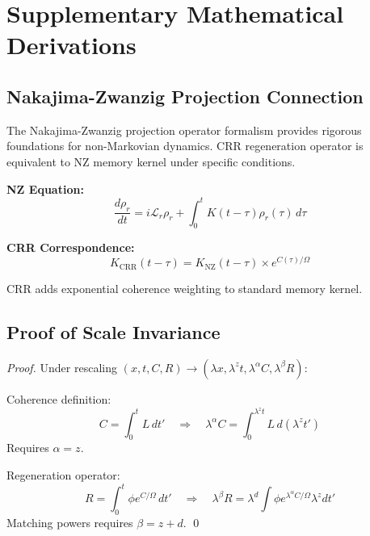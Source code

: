 \documentclass[11pt,a4paper]{article}
\theoremstyle{definition}
\theoremstyle{remark}
\begin{document}
\section{Supplementary Mathematical Derivations}

\subsection{Nakajima-Zwanzig Projection Connection}

The Nakajima-Zwanzig projection operator formalism provides rigorous foundations for non-Markovian dynamics. CRR regeneration operator is equivalent to NZ memory kernel under specific conditions.

\textbf{NZ Equation:}
\begin{equation}
\frac{d\rho_r}{dt} = i\mathcal{L}_r \rho_r + \int_0^t K(t-\tau) \rho_r(\tau)\,d\tau
\end{equation}

\textbf{CRR Correspondence:}
\begin{equation}
K_{\text{CRR}}(t-\tau) = K_{\text{NZ}}(t-\tau) \times e^{C(\tau)/\Omega}
\end{equation}

CRR adds exponential coherence weighting to standard memory kernel.

\subsection{Proof of Scale Invariance}

\begin{proof}
Under rescaling $(x,t,C,R) \to (\lambda x, \lambda^z t, \lambda^\alpha C, \lambda^\beta R)$:

Coherence definition:
\begin{equation}
C = \int_0^t L\,dt' \quad \Rightarrow \quad \lambda^\alpha C = \int_0^{\lambda^z t} L\,d(\lambda^z t')
\end{equation}
Requires $\alpha = z$.

Regeneration operator:
\begin{equation}
R = \int_0^t \phi e^{C/\Omega}\,dt' \quad \Rightarrow \quad \lambda^\beta R = \lambda^d \int \phi e^{\lambda^\alpha C/\Omega} \lambda^z dt'
\end{equation}
Matching powers requires $\beta = z + d$. \qed
\end{proof}
\end{document}
